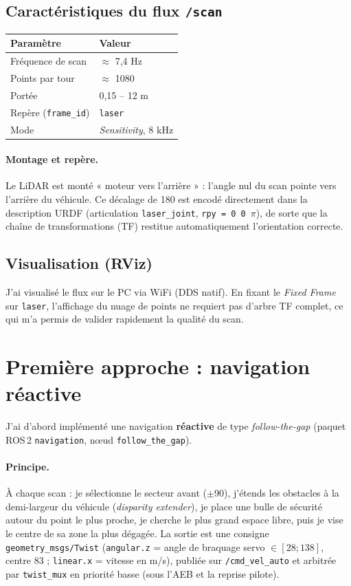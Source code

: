 \documentclass[a4paper,11pt]{article}
\begin{document}
\subsection{Caractéristiques du flux \texttt{/scan}}
\begin{center}
\begin{tabular}{@{}ll@{}}
\toprule
Paramètre & Valeur \\
\midrule
Fréquence de scan & $\approx$ 7,4 Hz \\
Points par tour & $\approx$ 1080 \\
Portée & 0,15 -- 12 m \\
Repère (\texttt{frame\_id}) & \texttt{laser} \\
Mode & \emph{Sensitivity}, 8 kHz \\
\bottomrule
\end{tabular}
\end{center}

\paragraph{Montage et repère.} Le LiDAR est monté « moteur vers l'arrière » :
l'angle nul du scan pointe vers l'arrière du véhicule. Ce décalage de 180\textdegree{}
est encodé directement dans la description URDF (articulation
\texttt{laser\_joint}, \texttt{rpy = 0\ 0\ $\pi$}), de sorte que la chaîne de
transformations (TF) restitue automatiquement l'orientation correcte.

\subsection{Visualisation (RViz)}
J'ai visualisé le flux sur le PC via WiFi (DDS natif). En fixant le \emph{Fixed
Frame} sur \texttt{laser}, l'affichage du nuage de points ne requiert pas d'arbre
TF complet, ce qui m'a permis de valider rapidement la qualité du scan.

\section{Première approche : navigation réactive}
J'ai d'abord implémenté une navigation \textbf{réactive} de type
\emph{follow-the-gap} (paquet ROS\,2 \texttt{navigation}, n{\oe}ud
\texttt{follow\_the\_gap}).

\paragraph{Principe.} À chaque scan : je sélectionne le secteur avant
($\pm$90\textdegree), j'étends les obstacles à la demi-largeur du véhicule
(\emph{disparity extender}), je place une bulle de sécurité autour du point le plus
proche, je cherche le plus grand espace libre, puis je vise le centre de sa zone la
plus dégagée. La sortie est une consigne \texttt{geometry\_msgs/Twist}
(\texttt{angular.z} = angle de braquage servo $\in[28;138]$, centre 83 ;
\texttt{linear.x} = vitesse en m/s), publiée sur \texttt{/cmd\_vel\_auto} et
arbitrée par \texttt{twist\_mux} en priorité basse (sous l'AEB et la reprise pilote).
\end{document}
